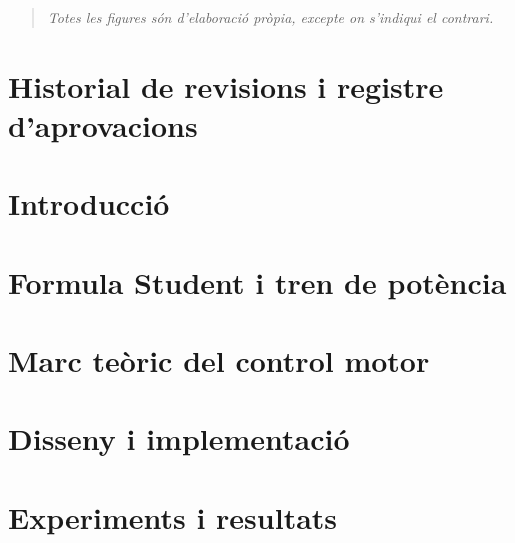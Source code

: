 \documentclass[a4paper,12pt]{article}
\begin{document}

\newpage
\tableofcontents

\newpage
\listoffigures
\begin{quote}
    \emph{Totes les figures són d'elaboració pròpia, excepte on s'indiqui el contrari. }
\end{quote}
\listoftables

\newpage
\printacronyms[template=tabular, name=Acrònims]



\clearpage \section*{Historial de revisions i registre d'aprovacions}


%

\clearpage \section{Introducció}


\clearpage \section{Formula Student i tren de potència}


\clearpage \section{Marc teòric del control motor}


\clearpage \section{Disseny i implementació}


\clearpage \section{Experiments i resultats}

\end{document}
